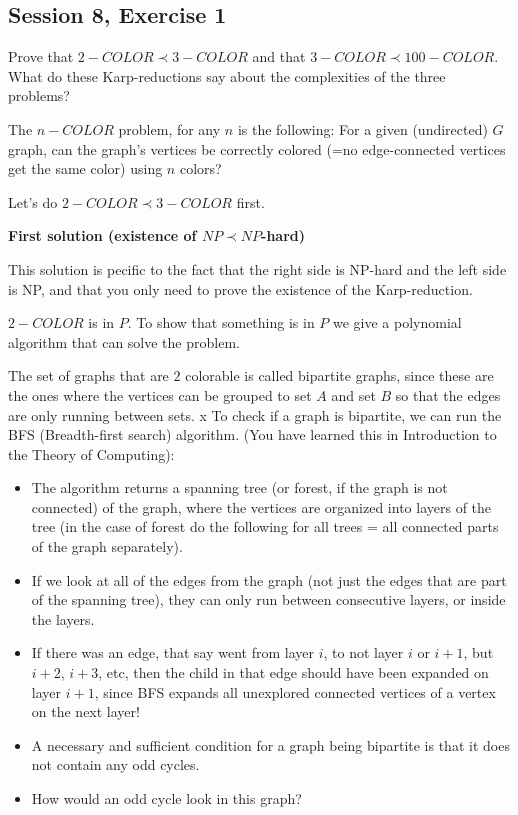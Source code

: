 \subsection {Session 8, Exercise 1}
\label{8f1}


Prove that $2-COLOR \prec 3-COLOR$ and that $3-COLOR \prec 100-COLOR$. What do these Karp-reductions say about the complexities of the three problems?


The $n-COLOR$ problem, for any $n$ is the following:  For a given (undirected) $G$ graph, can the graph's vertices be correctly colored (=no edge-connected vertices get the same color) using $n$ colors? 

Let's do $2-COLOR \prec 3-COLOR$ first.

\separate
\separate

\textbf{First solution (existence of $NP \prec NP$-hard)}

This solution is pecific to the fact that the right side is NP-hard and the left side is NP, and that you only need to prove the existence of the Karp-reduction.

$2-COLOR$ is in $P$. To show that something is in $P$ we give a polynomial algorithm that can solve the problem.

The set of graphs that are $2$ colorable is called bipartite graphs, since these are the ones where the vertices can be grouped to set $A$ and set $B$ so that the edges are only running between sets.
x
To check if a graph is bipartite, we can run the BFS (Breadth-first search) algorithm. (You have learned this in Introduction to the Theory of Computing):

\begin{itemize}
    \item The algorithm returns a spanning tree (or forest, if the graph is not connected) of the graph, where the vertices are organized into layers of the tree (in the case of forest do the following for all trees = all connected parts of the graph separately).
    \item If we look at all of the edges from the graph (not just the edges that are part of the spanning tree), they can only run between consecutive layers, or inside the layers. 
    \item If there was an edge, that say went from layer $i$, to not layer $i$ or $i+1$, but $i+2$, $i+3$, etc, then the child in that edge should have been expanded on layer $i+1$, since BFS expands all unexplored connected vertices of a vertex on the next layer!
    \item A necessary and sufficient condition for a graph being bipartite is that it does not contain any odd cycles.
    \item How would an odd cycle look in this graph?
\end{itemize}


